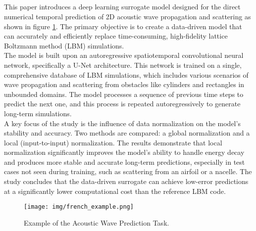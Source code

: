 		\subsection{}
			This paper introduces a deep learning surrogate model designed for the direct numerical temporal prediction of 2D acoustic wave propagation and scattering as shown in figure \ref{fig:acoustic-waves}. The primary objective is to create a data-driven model that can accurately and efficiently replace time-consuming, high-fidelity lattice Boltzmann method (LBM) simulations.\\
			The model is built upon an autoregressive spatiotemporal convolutional neural network, specifically a U-Net architecture. This network is trained on a single, comprehensive database of LBM simulations, which includes various scenarios of wave propagation and scattering from obstacles like cylinders and rectangles in unbounded domains. The model processes a sequence of previous time steps to predict the next one, and this process is repeated autoregressively to generate long-term simulations.\\
			A key focus of the study is the influence of data normalization on the model's stability and accuracy. Two methods are compared: a global normalization and a local (input-to-input) normalization. The results demonstrate that local normalization significantly improves the model's ability to handle energy decay and produces more stable and accurate long-term predictions, especially in test cases not seen during training, such as scattering from an airfoil or a nacelle. The study concludes that the data-driven surrogate can achieve low-error predictions at a significantly lower computational cost than the reference LBM code.
			\begin{figure}[H]
				\centering
				\texttt{[image: img/french\_example.png]}
				\caption[Example of the Acoustic Wave Prediction Task.]{Example of the Acoustic Wave Prediction Task.}
				\label{fig:acoustic-waves}
			\end{figure}
		\newpage
